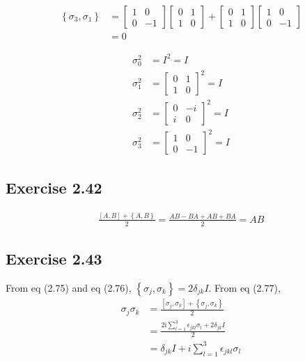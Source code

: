 \documentclass[a4paper,12pt]{article}
\begin{document}
\begin{align*}
\left\{\sigma_3, \sigma_1 \right\} &= \begin{bmatrix}
1 & 0 \\
0 & -1
\end{bmatrix}
\begin{bmatrix}
0 & 1 \\
1 & 0
\end{bmatrix}
+
\begin{bmatrix}
0 & 1 \\
1 & 0
\end{bmatrix}
\begin{bmatrix}
1 & 0 \\
0 & -1
\end{bmatrix}\\
&=0
\end{align*}

\begin{align*}
	\sigma_0^2 &= I^2 = I\\
%
	\sigma_1^2 &= \begin{bmatrix}
	0 & 1 \\
	1 & 0
	\end{bmatrix} ^2 = I\\
%
	\sigma_2^2 &= \begin{bmatrix}
	0 & -i \\
	i & 0
	\end{bmatrix} ^2 = I\\
%
	\sigma_3^2 &= \begin{bmatrix}
	1 & 0 \\
	0 & -1
	\end{bmatrix} ^2 = I
\end{align*}



\subsection*{Exercise 2.42}
\begin{align*}
	\frac{\left[A, B \right] + \left\{A, B\right\}}{2} = \frac{AB - BA + AB + BA}{2} = AB
\end{align*}



\subsection*{Exercise 2.43}
From eq (2.75) and eq (2.76), $\left\{\sigma_j,  \sigma_k \right\} = 2 \delta_{jk} I$.
From eq (2.77),
\begin{align*}
	\sigma_j \sigma_k &= \frac{\left[\sigma_j, \sigma_k  \right] + \left\{\sigma_j, \sigma_k \right\}}{2}\\
		&= \frac{2i \sum_{l=1}^{3} \epsilon_{jkl}\sigma_l +  2 \delta_{jk} I}{2}\\
		&= \delta_{jk} I + i \sum_{l=1}^{3} \epsilon_{jkl}\sigma_l
\end{align*}
\end{document}
